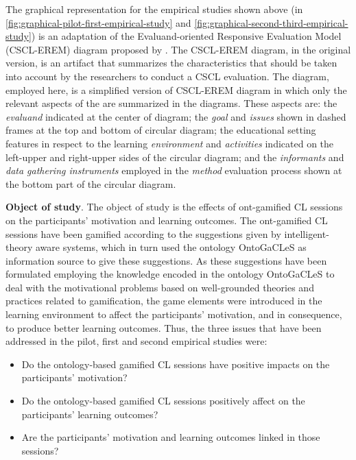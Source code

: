 \newpage
The graphical representation for the empirical studies shown above (in \autoref{fig:graphical-pilot-first-empirical-study} and \autoref{fig:graphical-second-third-empirical-study}) is an adaptation of the Evaluand-oriented Responsive Evaluation Model (CSCL-EREM) diagram proposed by . The CSCL-EREM diagram, in the original version, is an artifact that summarizes the characteristics that should be taken into account by the researchers to conduct a CSCL evaluation. The diagram, employed here, is a simplified version of CSCL-EREM diagram in which only the relevant aspects of the  are summarized in the diagrams. These aspects are: the \emph{evaluand} indicated at the center of diagram; the \emph{goal} and \emph{issues} shown in dashed frames at the top and bottom of circular diagram; the educational setting features in respect to the learning \emph{environment} and \emph{activities} indicated on the left-upper and right-upper sides of the circular diagram; and the \emph{informants} and \emph{data gathering instruments} employed in the \emph{method} evaluation process shown at the bottom part of the circular diagram.

\textbf{Object of study}. The object of study is the effects of ont-gamified CL sessions on the participants' motivation and learning outcomes. The ont-gamified CL sessions have been gamified according to the suggestions given by intelligent-theory aware systems, which in turn used the ontology OntoGaCLeS as information source to give these suggestions. 
As these suggestions have been formulated employing the knowledge encoded in the ontology OntoGaCLeS to deal with the motivational problems based on well-grounded theories and practices related to gamification, the game elements were introduced in the learning environment to affect the participants' motivation, and in consequence, to produce better learning outcomes. Thus, the three issues that have been addressed in the pilot, first and second empirical studies were:

\begin{itemize}
\item Do the ontology-based gamified CL sessions have positive impacts on the participants' motivation?
\item Do the ontology-based gamified CL sessions positively affect on the participants' learning outcomes?
\item Are the participants' motivation and learning outcomes linked in those sessions?
\end{itemize}

